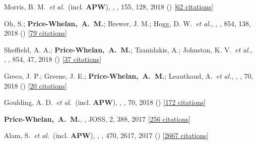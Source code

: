 \item[{\color{deemph}\scriptsize37}]Morris, B. M.~\textit{et al.}~(incl. \textbf{APW}), , \aj, 155, 128, 2018 () [\href{http://adsabs.harvard.edu/abs/2018AJ....155..128M}{62 citations}]

\item[{\color{deemph}\scriptsize36}]Oh, S.; \textbf{Price-Whelan,~A.~M.}; Brewer, J. M.; Hogg, D. W.~\textit{et al.}, , \apj, 854, 138, 2018 () [\href{http://adsabs.harvard.edu/abs/2018ApJ...854..138O}{79 citations}]

\item[{\color{deemph}\scriptsize35}]Sheffield, A. A.; \textbf{Price-Whelan,~A.~M.}; Tzanidakis, A.; Johnston, K. V.~\textit{et al.}, , \apj, 854, 47, 2018 () [\href{http://adsabs.harvard.edu/abs/2018ApJ...854...47S}{37 citations}]

\item[{\color{deemph}\scriptsize34}]Greco, J. P.; Greene, J. E.; \textbf{Price-Whelan,~A.~M.}; Leauthaud, A.~\textit{et al.}, , \pasj, 70, 2018 () [\href{http://adsabs.harvard.edu/abs/2018PASJ...70S..19G}{20 citations}]

\item[{\color{deemph}\scriptsize33}]Goulding, A. D.~\textit{et al.}~(incl. \textbf{APW}), , \pasj, 70, 2018 () [\href{http://adsabs.harvard.edu/abs/2018PASJ...70S..37G}{172 citations}]

\item[{\color{deemph}\scriptsize32}]\textbf{Price-Whelan,~A.~M.}, , JOSS, 2, 388, 2017 [\href{http://adsabs.harvard.edu/abs/2017JOSS....2..388P}{256 citations}]

\item[{\color{deemph}\scriptsize31}]Alam, S.~\textit{et al.}~(incl. \textbf{APW}), , \mnras, 470, 2617, 2017 () [\href{http://adsabs.harvard.edu/abs/2017MNRAS.470.2617A}{2667 citations}]

